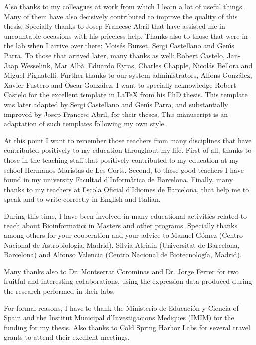 Also thanks to my colleagues at work from which I learn a lot of useful things.
Many of them have also decisively contributed to improve the quality of this thesis. 
Specially thanks to Josep Francesc Abril that have assisted me in uncountable 
occasions with his priceless help. Thanks also to those that were in the lab when I 
arrive over there: Mois\'es Burset, Sergi Castellano and Gen\'{\i}s Parra. To those 
that arrived later, many thanks as well: Robert Castelo, Jan-Jaap Wesselink, 
Mar Alb\`a, Eduardo Eyras, Charles Chapple, Nicol\'as Bellora and Miguel Pignatelli.
Further thanks to our system administrators, Alfons Gonz\'alez, Xavier Fustero 
and \`Oscar Gonz\'alez. I want to specially acknowledge Robert Castelo for
the excellent template in \LaTeX{} from his PhD thesis. This template was 
later adapted by Sergi Castellano and Gen\'{\i}s Parra, and substantially 
improved by Josep Francesc Abril, for their theses. This manuscript is an 
adaptation of such templates following my own style.

At this point I want to remember those teachers from many disciplines that have
contributed positively to my education throughout my life. First of all, thanks to 
those in the teaching staff that positively contributed to my education at my school 
Hermanos Maristas de Les Corts. Second, to those good teachers I have found in my 
university Facultad d'Inform\`atica de Barcelona. Finally, many thanks to my teachers 
at Escola Oficial d'Idiomes de Barcelona, that help me to speak and to write correctly 
in English and Italian. 

During this time, I have been involved in many educational activities related
to teach about Bioinformatics in Masters and other programs. Specially thanks among others
for your cooperation and your advice to Manuel G\'omez (Centro Nacional de 
Astrobiolog\'ia, Madrid), Silvia Atriain (Universitat de Barcelona, Barcelona) and 
Alfonso Valencia (Centro Nacional de Biotecnolog\'ia, Madrid).

Many thanks also to Dr. Montserrat Corominas and Dr. Jorge Ferrer for two fruitful and interesting 
collaborations, using the expression data produced during the research performed in their labs.

For formal reasons, I have to thank the Ministerio de Educaci\'on y Ciencia of Spain 
and the Institut Municipal d'Investigacions Mediques (IMIM) for the funding for my 
thesis. Also thanks to Cold Spring Harbor Labs for several travel grants to attend
their excellent meetings.

